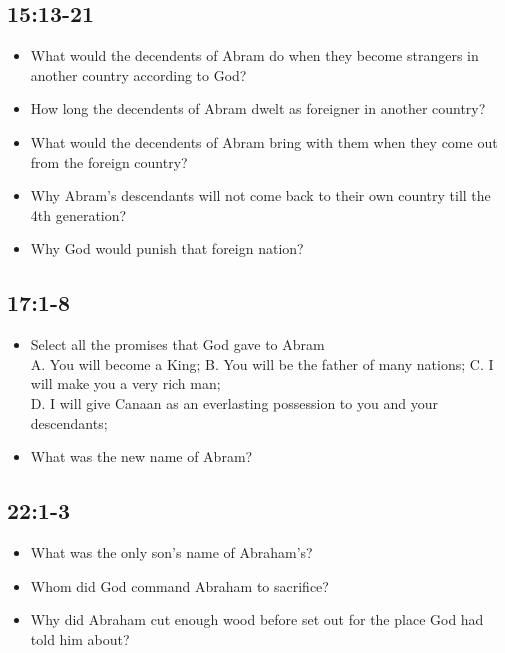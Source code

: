 \subsection{15:13-21}
\begin{itemize}
\item What would the decendents of Abram do when they become strangers in another country according to God?
\item How long the decendents of Abram dwelt as foreigner in another country?
\item What would the decendents of Abram bring with them when they come out from the foreign country?
\item Why Abram's descendants will not come back to their own country till the 4th generation?
\item Why God would punish that foreign nation?
\end{itemize}

\subsection{17:1-8}
\begin{itemize}
\item Select all the promises that God gave to Abram\\
A. You will become a King;
B. You will be the father of many nations;
C. I will make you a very rich man;\\
D. I will give Canaan as an everlasting possession to you and your descendants;
\item What was the new name of Abram?
\end{itemize}



\subsection{22:1-3}
\begin{itemize}
\item What was the only son's name of Abraham's?
\item Whom did God command Abraham to sacrifice?
\item Why did Abraham cut enough wood before set out for the place God had told him about?
\end{itemize}

